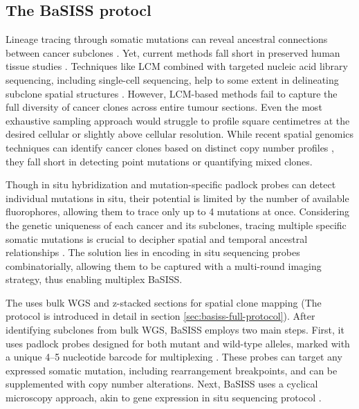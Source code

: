 \subsection{The \ac{BaSISS} protocl}
\label{sec:basiss-intro}
Lineage tracing through somatic mutations can reveal ancestral connections between cancer subclones . Yet, current methods fall short in preserved human tissue studies \parencite{Yates2015-xk,Jamal-Hanjani2017-uv,Jones2008-sd,Shah2009-xz,Casasent2018-gx,Tarabichi2021-xx}. Techniques like \acf{LCM} combined with targeted nucleic acid library sequencing, including single-cell sequencing, help to some extent in delineating subclone spatial structures \parencite{Shen2000-xj,Casasent2018-gx}. However, \ac{LCM}-based methods fail to capture the full diversity of cancer clones across entire tumour sections. Even the most exhaustive sampling approach would struggle to profile square centimetres at the desired cellular or slightly above cellular resolution. While recent spatial genomics techniques can identify cancer clones based on distinct copy number profiles \parencite{Zhao2022-xd,Erickson2022-zh}, they fall short in detecting point mutations or quantifying mixed clones.

Though in situ hybridization \parencite{Janiszewska2015-kb} and mutation-specific padlock probes \parencite{Larsson2010-bp,Grundberg2013-te,Ke2013-ux,Baker2017-dv} can detect individual mutations in situ, their potential is limited by the number of available fluorophores, allowing them to trace only up to 4 mutations at once. Considering the genetic uniqueness of each cancer and its subclones, tracing multiple specific somatic mutations is crucial to decipher spatial and temporal ancestral relationships \parencite{Nik-Zainal2012-zz}. The solution lies in encoding in situ sequencing probes combinatorially, allowing them to be captured with a multi-round imaging strategy, thus enabling multiplex \acf{BaSISS}.

The  uses bulk \ac{WGS} and z-stacked sections for spatial clone mapping (The protocol is introduced in detail in section \cref{sec:basiss-full-protocol}). After identifying subclones from bulk WGS, \ac{BaSISS} employs two main steps. First, it uses padlock probes designed for both mutant and wild-type alleles, marked with a unique 4–5 nucleotide barcode for multiplexing \parencite{Ke2013-ux}. These probes can target any expressed somatic mutation, including rearrangement breakpoints, and can be supplemented with copy number alterations. Next, \ac{BaSISS}  uses a cyclical microscopy approach, akin to gene expression in situ sequencing protocol \parencite{Ke2013-ux,Svedlund2019-xb} .


